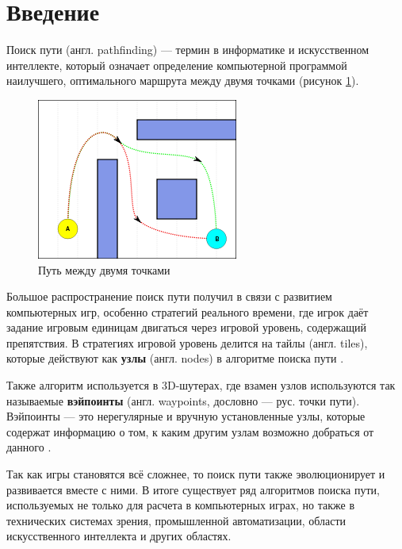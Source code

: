\tableofcontents

\section*{Введение}

Поиск пути (англ. pathfinding) --- термин в информатике и искусственном интеллекте, который означает определение компьютерной программой наилучшего, оптимального маршрута между двумя точками \cite{wiki:pathfinding} (рисунок \ref{fig:pathfinding}).

\begin{figure}[ht]
    \includegraphics[width=.5\linewidth]{Figures/pathfinding.png}
    \caption{Путь между двумя точками}
    \label{fig:pathfinding}
\end{figure}

Большое распространение поиск пути получил в связи с развитием компьютерных игр, особенно стратегий реального времени, где игрок даёт задание игровым единицам двигаться через игровой уровень, содержащий препятствия. В стратегиях игровой уровень делится на тайлы (англ. tiles), которые действуют как \textbf{узлы} (англ. nodes) в алгоритме поиска пути \cite{wiki:pathfinding}.

Также алгоритм используется в 3D-шутерах, где взамен узлов используются так называемые \textbf{вэйпоинты} (англ. waypoints, дословно --- рус. точки пути). Вэйпоинты --- это нерегулярные и вручную установленные узлы, которые содержат информацию о том, к каким другим узлам возможно добраться от данного \cite{wiki:pathfinding}.

Так как игры становятся всё сложнее, то поиск пути также эволюционирует и развивается вместе с ними. В итоге существует ряд алгоритмов поиска пути, используемых не только для расчета в компьютерных играх, но также в технических системах зрения, промышленной автоматизации, области искусственного интеллекта и других областях.

